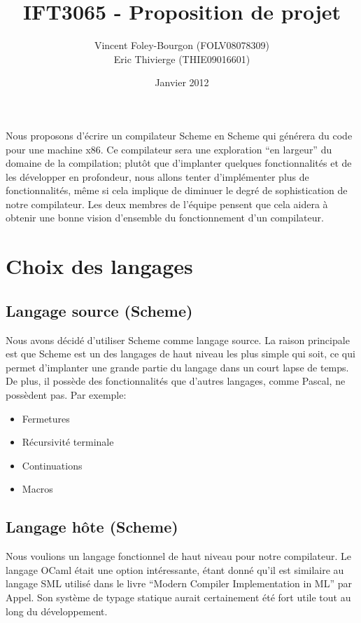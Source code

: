\documentclass[11pt]{article}
\begin{document}
\title{IFT3065 - Proposition de projet}
\date{Janvier 2012}
\author{Vincent Foley-Bourgon (FOLV08078309) \\
Eric Thivierge (THIE09016601)}
\maketitle

\abstract

Nous proposons d'écrire un compilateur Scheme en Scheme qui générera
du code pour une machine x86.  Ce compilateur sera une exploration
``en largeur'' du domaine de la compilation; plutôt que d'implanter
quelques fonctionnalités et de les développer en profondeur, nous
allons tenter d'implémenter plus de fonctionnalités, même si cela
implique de diminuer le degré de sophistication de notre compilateur.
Les deux membres de l'équipe pensent que cela aidera à obtenir une
bonne vision d'ensemble du fonctionnement d'un compilateur.

\section{Choix des langages}

\subsection{Langage source (Scheme)}

Nous avons décidé d'utiliser Scheme comme langage source.  La raison
principale est que Scheme est un des langages de haut niveau les plus
simple qui soit, ce qui permet d'implanter une grande partie du
langage dans un court lapse de temps.  De plus, il possède des
fonctionnalités que d'autres langages, comme Pascal, ne possèdent
pas. Par exemple:

\begin{itemize}
\item Fermetures
\item Récursivité terminale
\item Continuations
\item Macros
\end{itemize}


\subsection{Langage hôte (Scheme)}

Nous voulions un langage fonctionnel de haut niveau pour notre
compilateur.  Le langage OCaml était une option intéressante, étant
donné qu'il est similaire au langage SML utilisé dans le livre
``Modern Compiler Implementation in ML'' par Appel.  Son système de
typage statique aurait certainement été fort utile tout au long du
développement.
\end{document}
